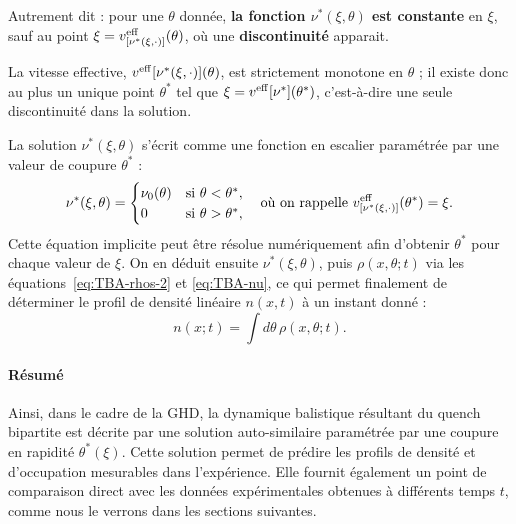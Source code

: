 Autrement dit : pour une $\theta$ donnée, {\bf la fonction $\nu^\ast(\xi,\theta)$ est constante} en $\xi$, sauf au point $\xi = v^{\rm eff}_{[\nu^\ast(\xi , \cdot ) ]}(\theta)$, où une {\bf discontinuité} apparait.


La vitesse effective, $v^{\rm eff}{[\nu^\ast(\xi , \cdot ) ]}(\theta)$, est strictement monotone en $\theta$ ; il existe donc au plus un unique point $\theta^\ast$ tel que $\xi = v^{\rm eff}{[\nu^\ast]}(\theta^\ast)$, c’est-à-dire une seule discontinuité dans la solution.

La solution $\nu^*(\xi,\theta)$ s’écrit comme une fonction en escalier paramétrée par une valeur de coupure $\theta^*$ :
\begin{equation}
    \label{eq:nuetoile}
    \nu^*(\xi,\theta) = 
    \begin{cases}
        \nu_0(\theta) & \text{si } \theta < \theta^*, \\
        0 & \text{si } \theta > \theta^*,
    \end{cases}
    \quad \text{où on rappelle } v^{\rm eff}_{[\nu^*(\xi,\cdot)]}(\theta^*) = \xi.
\end{equation}
Cette équation implicite peut être résolue numériquement afin d'obtenir $\theta^*$ pour chaque valeur de $\xi$. On en déduit ensuite $\nu^*(\xi,\theta)$, puis $\rho(x,\theta;t)$ via les équations~\eqref{eq:TBA-rhos-2} et \eqref{eq:TBA-nu}, ce qui permet finalement de déterminer le profil de densité linéaire $n(x,t)$ à un instant donné : 
\begin{equation}
    n(x;t) = \int d\theta \, \rho(x,\theta ; t).
    \label{chap6:eq:lineardensity}
\end{equation}


\paragraph{Résumé}

Ainsi, dans le cadre de la GHD, la dynamique balistique résultant du quench bipartite est décrite par une solution auto-similaire paramétrée par une coupure en rapidité $\theta^*(\xi)$. Cette solution permet de prédire les profils de densité et d’occupation mesurables dans l’expérience. Elle fournit également un point de comparaison direct avec les données expérimentales obtenues à différents temps $t$, comme nous le verrons dans les sections suivantes.

